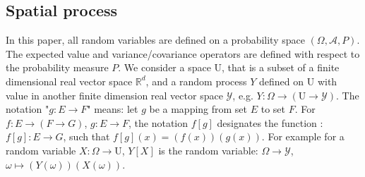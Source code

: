 \documentclass[12pt]{article}
\theoremstyle{definition}
\theoremstyle{remark}
\newcommand{\Sample}{S}
\newcommand{\Pop}{\mathrm{U}}
\newcommand{\position}{\mathbf{x}}
\newcommand{\SignalSpace}{\mathscr{Y}}
\newcommand{\Signal}{Y}
\newcommand{\signal}{\mathbf{y}}
\begin{document}
\subsection{Spatial process}
In this paper, all random variables are defined on a probability space $(\Omega,\mathscr{A},P)$. The expected value and variance/covariance operators are defined with respect to the probability measure $P$. 
We consider a space $\Pop$, that is a subset of a finite dimensional real vector space $\mathbb{R}^d$, and a random process $\Signal$ defined on $\Pop$ with value in another finite dimension real vector space $\SignalSpace$, e.g. $Y:\Omega\to(\Pop\to\SignalSpace)$.
The notation "$g:E\to F$" means: let $g$ be a mapping from set $E$ to set $F$. For $f:E\to (F\to G)$, $g:E\to F$,  the notation $f[g]$ designates the function :  $f[g]:E\to G$, such that $f[g](x)=(f(x))(g(x))$. For example for a random variable $X:\Omega\to\Pop$, $\Signal[X]$ is the random variable: $\Omega\to\SignalSpace$, $\omega\mapsto(\Signal(\omega))(X(\omega))$.
\end{document}
